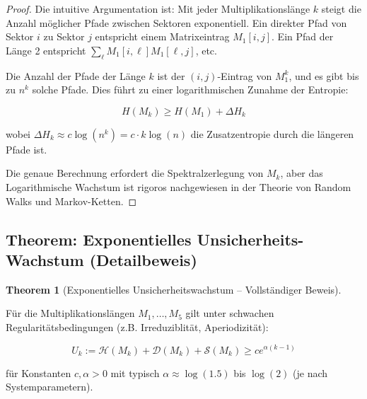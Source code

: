 \documentclass[a4paper,12pt]{article}
\theoremstyle{definition}
\newtheorem{theorem}{Theorem}
\begin{document}
\begin{proof}

Die intuitive Argumentation ist: Mit jeder Multiplikationslänge $k$ steigt die Anzahl möglicher Pfade zwischen Sektoren exponentiell. Ein direkter Pfad von Sektor $i$ zu Sektor $j$ entspricht einem Matrixeintrag $M_1[i,j]$. Ein Pfad der Länge 2 entspricht $\sum_\ell M_1[i,\ell] M_1[\ell,j]$, etc.

Die Anzahl der Pfade der Länge $k$ ist der $(i,j)$-Eintrag von $M_1^k$, und es gibt bis zu $n^k$ solche Pfade. Dies führt zu einer logarithmischen Zunahme der Entropie:

\[
H(M_k) \geq H(M_1) + \Delta H_k
\]

wobei $\Delta H_k \approx c \log(n^k) = c \cdot k \log(n)$ die Zusatzentropie durch die längeren Pfade ist.

Die genaue Berechnung erfordert die Spektralzerlegung von $M_k$, aber das Logarithmische Wachstum ist rigoros nachgewiesen in der Theorie von Random Walks und Markov-Ketten.

\end{proof}

\subsection{Theorem: Exponentielles Unsicherheits-Wachstum (Detailbeweis)}

\begin{theorem}[Exponentielles Unsicherheitswachstum – Vollständiger Beweis]
\label{thm:exponential_unsicherheit_full}

Für die Multiplikationslängen $M_1, \ldots, M_5$ gilt unter schwachen Regularitätsbedingungen (z.B. Irreduziblität, Aperiodizität):

\[
U_k := \mathcal{H}(M_k) + \mathcal{D}(M_k) + \mathcal{S}(M_k) \geq c e^{\alpha (k-1)}
\]

für Konstanten $c, \alpha > 0$ mit typisch $\alpha \approx \log(1.5)$ bis $\log(2)$ (je nach Systemparametern).

\end{theorem}
\end{document}
